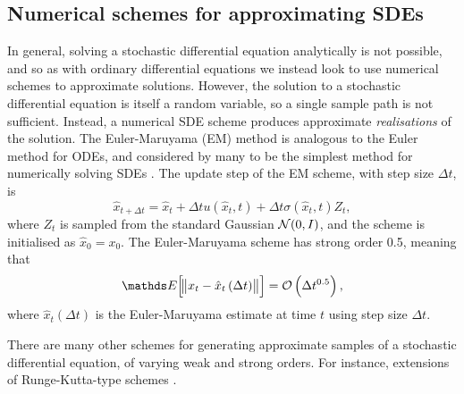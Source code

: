 \subsection{Numerical schemes for approximating SDEs}
In general, solving a stochastic differential equation analytically is not possible, and so as with ordinary differential equations we instead look to use numerical schemes to approximate solutions.
However, the solution to a stochastic differential equation is itself a random variable, so a single sample path is not sufficient.
Instead, a numerical SDE scheme produces approximate \emph{realisations} of the solution.
The Euler-Maruyama (EM) method is analogous to the Euler method for ODEs, and considered by many to be the simplest method for numerically solving SDEs \citep{KloedenPlaten_1992_NumericalSolutionStochastic}.
The update step of the EM scheme, with step size \(\Delta t\), is
\begin{equation}
	\hat{x}_{t + \Delta t} = \hat{x}_{t} + \Delta t u\left(\hat{x}_t, t\right) + \Delta t \sigma\left(\hat{x}_t, t\right) Z_t,
	\label{eqn:em_step}
\end{equation}
where \(Z_t\) is sampled from the standard Gaussian \(\mathcal{N}\!\left(0,I\right)\), and the scheme is initialised as \(\hat{x}_0 = x_0\).
The Euler-Maruyama scheme has strong order 0.5, meaning that
\[
	\avg{\norm{x_t - \hat{x}_{t}\left(\Delta t\right)}} = \mathcal{O}\left(\Delta t^{0.5}\right),
\]
where \(\hat{x}_t\left(\Delta t\right)\) is the Euler-Maruyama estimate at time \(t\) using step size \(\Delta t\).


There are many other schemes for generating approximate samples of a stochastic differential equation, of varying weak and strong orders.
For instance, extensions of Runge-Kutta-type schemes \citep{Roberts_2012_ModifyImprovedEuler,Rossler_2010_RungeKuttaMethodsStrong}.






